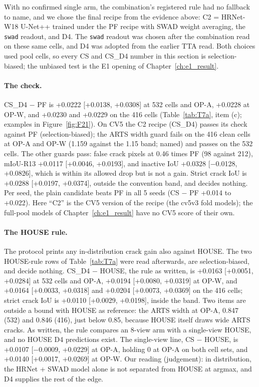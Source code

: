 With no confirmed single arm, the combination's registered rule had no fallback to name, and we chose the final recipe from the
evidence above: C2 = HRNet-W18 U-Net++ trained under the PF recipe with SWAD weight averaging, the \texttt{swad} readout, and D4.
The \texttt{swad} readout was chosen after the combination read on these same cells, and D4 was adopted from the earlier TTA read.
Both choices used pool cells, so every CS and CS\_D4 number in this section is selection-biased; the unbiased test is the E1
opening of Chapter~\ref{ch:e1_result}.

\paragraph{The check.} CS\_D4 $-$ PF is +0.0222 [+0.0138, +0.0308] at 532 cells and OP-A, +0.0228 at OP-W, and +0.0230 and
+0.0229 on the 416 cells (Table~\ref{tab:T7a}, item (c); examples in Figure~\ref{fig:F21}). On CV5 the C2 recipe (CS\_D4) passes its check against PF
(selection-biased); the ARTS width guard fails on the 416 clean cells at OP-A and OP-W (1.159 against the 1.15 band; named) and
passes on the 532 cells. The other guards pass: false crack pixels at 0.46 times PF (98 against 212), mIoU-R13 +0.0117
[+0.0046, +0.0193], and inactive IoU +0.0328 [$-$0.0128, +0.0826], which is within its allowed drop but is not a gain. Strict
crack IoU is +0.0288 [+0.0197, +0.0374], outside the convention band, and decides nothing. Per seed, the plain candidate beats PF
in all 5 seeds (CS $-$ PF +0.014 to +0.022). Here ``C2'' is the CV5 version of the recipe (the cv5v3 fold models); the full-pool
models of Chapter~\ref{ch:e1_result} have no CV5 score of their own.

\paragraph{The HOUSE rule.} The protocol prints any in-distribution crack gain also against HOUSE. The two HOUSE-rule rows of
Table~\ref{tab:T7a} were read afterwards, are selection-biased, and decide nothing. CS\_D4 $-$ HOUSE, the rule as written, is
+0.0163 [+0.0051, +0.0284] at 532 cells and OP-A, +0.0194 [+0.0080, +0.0319] at OP-W, and +0.0164 [+0.0033, +0.0318] and
+0.0204 [+0.0073, +0.0369] on the 416 cells; strict crack IoU is +0.0110 [+0.0029, +0.0198], inside the band. Two items are
outside a bound with HOUSE as reference: the ARTS width at OP-A, 0.847 (532) and 0.846 (416), just below 0.85, because HOUSE
itself draws wide ARTS cracks. As written, the rule compares an 8-view arm with a single-view HOUSE, and no HOUSE D4 predictions
exist. The single-view line, CS $-$ HOUSE, is +0.0107 [$-$0.0009, +0.0229] at OP-A, holding 0 at OP-A on both cell sets, and
+0.0140 [+0.0017, +0.0269] at OP-W. Our reading (judgement): in distribution, the HRNet + SWAD model alone is not separated
from HOUSE at argmax, and D4 supplies the rest of the edge.

